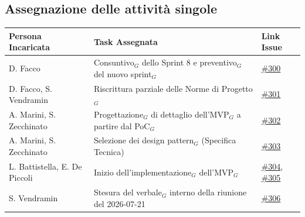 \documentclass[a4paper, 10pt, colorlinks=true, linkcolor=black, urlcolor=blue, citecolor=blue, hidelinks]{article}
\newcommand{\issue}[1]{\href{https://github.com/thebitless-group-swe/thebitless.github.io/issues/#1}{\##1}}
\begin{document}
\subsection{Assegnazione delle attività singole}
\begin{center}
    \renewcommand{\arraystretch}{1.4}
        \begin{tabular}{|p{4.2cm}|p{6.2cm}|p{2.2cm}|}
        \hline
        \textbf{Persona Incaricata} & \textbf{Task Assegnata} & \centering\textbf{Link Issue} \tabularnewline
        \hline
        D. Facco & Consuntivo$_G$ dello Sprint 8 e preventivo$_G$ del nuovo sprint$_G$ & \issue{300} \\
        \hline
        D. Facco, S. Vendramin & Riscrittura parziale delle Norme di Progetto$_G$ & \issue{301} \\
        \hline
        A. Marini, S. Zecchinato & Progettazione$_G$ di dettaglio dell'MVP$_G$ a partire dal PoC$_G$ & \issue{302} \\
        \hline
        A. Marini, S. Zecchinato & Selezione dei design pattern$_G$ (Specifica Tecnica) & \issue{303} \\
        \hline
        L. Battistella, E. De Piccoli & Inizio dell'implementazione$_G$ dell'MVP$_G$ & \issue{304}, \issue{305} \\
        \hline
        S. Vendramin & Stesura del verbale$_G$ interno della riunione del 2026-07-21 & \issue{306} \\
        \hline
    \end{tabular}
\end{center}

\appendix
\end{document}
